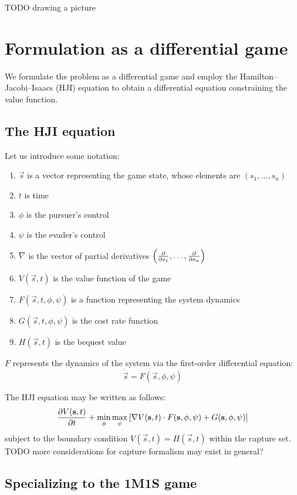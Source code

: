 \documentclass{article}
\begin{document}
TODO drawing a picture

\section{Formulation as a differential game}

We formulate the problem as a differential game and employ the
Hamilton--Jacobi--Isaacs (HJI) equation to obtain a differential equation constraining
the value function.

\subsection{The HJI equation}

Let us introduce some notation:
\begin{enumerate}
\item $\vec{s}$ is a vector representing the game state, whose elements are
$(s_1, \dots, s_n)$
\item $t$ is time
\item $\phi$ is the pursuer's control
\item $\psi$ is the evader's control
\item $\nabla$ is the vector of partial derivatives $\left(\pdv{}{s_1}, \dots,
\pdv{}{s_n}\right)$
\item $V(\vec{s}, t)$ is the value function of the game
\item $F(\vec{s}, t, \phi, \psi)$ is a function representing the system dynamics
\item $G(\vec{s}, t, \phi, \psi)$ is the cost rate function
\item $H(\vec{s}, t)$ is the bequest value
\end{enumerate}

$F$ represents the dynamics of the system via the first-order differential
equation:
\begin{equation}
\dot{\vec{s}} = F(\vec{s}, \phi, \psi)
\end{equation}

The HJI equation may be written as follows:
\begin{align}
\pdv{V(\mathbf{s}, t)}{t} + \min_{\phi} \max_{\psi} \left[
  \nabla V(\mathbf{s}, t) \cdot F(\mathbf{s}, \phi, \psi) + G(\mathbf{s}, \phi, \psi)
\right]
\end{align}
subject to the boundary condition $V(\vec{s}, t) = H(\vec{s}, t)$ within the
capture set.
TODO more considerations for capture formalism may exist in general?

\subsection{Specializing to the 1M1S game}
\end{document}
